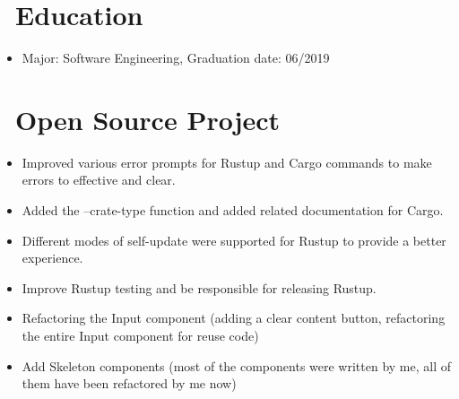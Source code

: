 \documentclass{resume}
\newcommand{\en}[1]{#1}
\newcommand{\zh}[1]{}
\begin{document}
\section{\faGraduationCap\ \en{Education}\zh{教育经历}}
\en{}
\zh{\datedsubsection{\textbf{重庆理工大学}, 本科}{2015/09 -- 2019/06}}
\begin{itemize}
      \item \en{Major: Software Engineering, Graduation date: 06/2019}
            \zh{软件工程，2019 年 6 月毕业}
\end{itemize}

\section{\faGithubAlt\ \en{Open Source Project}\zh{开源项目}}
\en{}
\zh{\role{活跃维护者}{\href{https://github.com/search?q=repo:rust-lang/cargo+repo:rust-lang/rustup++author:hi-rustin&type=commits}{260+ 个提交}}}
\begin{itemize}
      \item \en{Improved various error prompts for Rustup and Cargo commands to make errors to effective and clear.}
            \zh{改善了大量 Rustup 和 Cargo 命令的错误提示，让错误更有效更清晰。}
      \item \en{Added the --crate-type function and added related documentation for Cargo.}
            \zh{为 Cargo 添加了 --crate-type 功能和相关文档。}
      \item \en{Different modes of self-update were supported for Rustup to provide a better experience.}
            \zh{为 Rustup 支持了 self-update 的不同模式来提供更好的使用体验。}
      \item \en{Improve Rustup testing and be responsible for releasing Rustup.}
            \zh{改善 Rustup 测试，负责发布 Rustup。}
\end{itemize}

\en{}
\zh{\role{前维护者}{\href{https://github.com/ant-design/ant-design/commits?author=hi-rustin}{24+ 个提交}}}
\begin{itemize}
      \item \en{Refactoring the Input component (adding a clear content button, refactoring the entire Input component for reuse code)}
            \zh{重构 Input 组件（添加一个清除内容按钮，为了复用代码重构整个 Input 组件）}
      \item \en{Add Skeleton components (most of the components were written by me, all of them have been refactored by me now)}
            \zh{添加 Skeleton 组件（大部分组件由我编写，目前所有组件已被我重构）}
\end{itemize}
\end{document}
